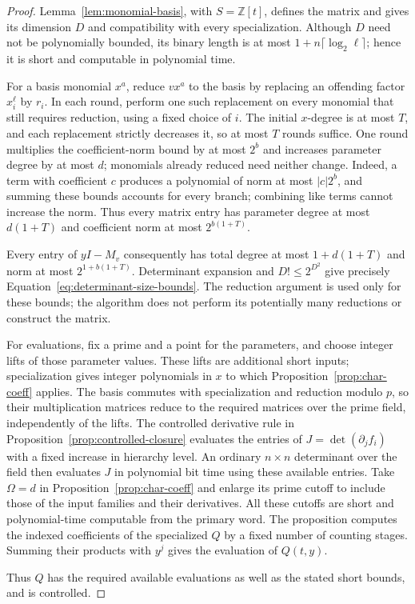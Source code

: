 \begin{proof}
Lemma~\ref{lem:monomial-basis}, with $S=\mathbb Z[t]$, defines the
matrix and gives its dimension $D$ and compatibility with every
specialization.  Although $D$ need not be polynomially bounded, its
binary length is at most $1+n\lceil\log_2\ell\rceil$; hence it is
short and computable in polynomial time.

For a basis monomial $x^a$, reduce $vx^a$ to the basis by replacing
an offending factor $x_i^\ell$ by $r_i$.  In each round, perform one
such replacement on every monomial that still requires reduction,
using a fixed choice of $i$.  The initial $x$-degree is at most $T$,
and each replacement strictly decreases it, so at most $T$ rounds
suffice.  One round multiplies the coefficient-norm bound by at most
$2^b$ and increases parameter degree by at most $d$; monomials
already reduced need neither change.  Indeed, a term with coefficient
$c$ produces a polynomial of norm at most $|c|2^b$, and summing these
bounds accounts for every branch; combining like terms cannot increase
the norm.  Thus every matrix entry has
parameter degree at most $d(1+T)$ and coefficient norm at most
$2^{b(1+T)}$.

Every entry of $yI-M_v$ consequently has total degree at most
$1+d(1+T)$ and norm at most $2^{1+b(1+T)}$.
Determinant expansion and $D!\le2^{D^2}$ give precisely
Equation~\eqref{eq:determinant-size-bounds}.  The reduction argument
is used only for these bounds; the algorithm does not perform its
potentially many reductions or construct the matrix.

For evaluations, fix a prime and a point for the parameters, and
choose integer lifts of those parameter values.  These lifts are
additional short inputs; specialization gives integer polynomials in
$x$ to which Proposition~\ref{prop:char-coeff} applies.  The basis
commutes with specialization and reduction modulo $p$, so their
multiplication matrices reduce to the required matrices over the
prime field, independently of the lifts.
The controlled derivative rule in
Proposition~\ref{prop:controlled-closure} evaluates the entries of
$J=\det(\partial_jf_i)$ with a fixed increase in hierarchy level.
An ordinary $n\times n$ determinant over the field then evaluates
$J$ in polynomial bit time using these available entries.  Take
$\Omega=d$ in Proposition~\ref{prop:char-coeff} and enlarge its prime
cutoff to include those of the input families and their derivatives.
All these cutoffs are short and polynomial-time computable from the
primary word.  The proposition computes the indexed coefficients of
the specialized $Q$ by a fixed number of counting stages.  Summing
their products with $y^j$ gives the evaluation of $Q(t,y)$.

Thus $Q$ has the required available
evaluations as well as the stated short bounds, and is controlled.
\end{proof}


